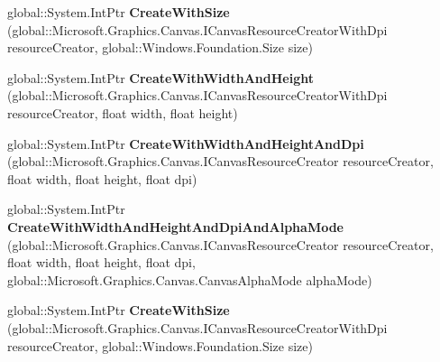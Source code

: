 \begin{DoxyCompactItemize}
\mbox{\label{interface_microsoft_1_1_graphics_1_1_canvas_1_1_u_i_1_1_xaml_1_1_i_canvas_image_source_factory_a4baedcf33415e7e6999fbfaef3bbfbcf}} 
global\+::\+System.\+Int\+Ptr {\bfseries Create\+With\+Size} (global\+::\+Microsoft.\+Graphics.\+Canvas.\+I\+Canvas\+Resource\+Creator\+With\+Dpi resource\+Creator, global\+::\+Windows.\+Foundation.\+Size size)
\item 
\mbox{\label{interface_microsoft_1_1_graphics_1_1_canvas_1_1_u_i_1_1_xaml_1_1_i_canvas_image_source_factory_a10963349bb9cd2efbf8a9fd0e452503b}} 
global\+::\+System.\+Int\+Ptr {\bfseries Create\+With\+Width\+And\+Height} (global\+::\+Microsoft.\+Graphics.\+Canvas.\+I\+Canvas\+Resource\+Creator\+With\+Dpi resource\+Creator, float width, float height)
\item 
\mbox{\label{interface_microsoft_1_1_graphics_1_1_canvas_1_1_u_i_1_1_xaml_1_1_i_canvas_image_source_factory_a6cfd3bc04a35df5bd6c867d8ded122c0}} 
global\+::\+System.\+Int\+Ptr {\bfseries Create\+With\+Width\+And\+Height\+And\+Dpi} (global\+::\+Microsoft.\+Graphics.\+Canvas.\+I\+Canvas\+Resource\+Creator resource\+Creator, float width, float height, float dpi)
\item 
\mbox{\label{interface_microsoft_1_1_graphics_1_1_canvas_1_1_u_i_1_1_xaml_1_1_i_canvas_image_source_factory_a7f81e40660e111a979eb5fc6d370cce8}} 
global\+::\+System.\+Int\+Ptr {\bfseries Create\+With\+Width\+And\+Height\+And\+Dpi\+And\+Alpha\+Mode} (global\+::\+Microsoft.\+Graphics.\+Canvas.\+I\+Canvas\+Resource\+Creator resource\+Creator, float width, float height, float dpi, global\+::\+Microsoft.\+Graphics.\+Canvas.\+Canvas\+Alpha\+Mode alpha\+Mode)
\item 
\mbox{\label{interface_microsoft_1_1_graphics_1_1_canvas_1_1_u_i_1_1_xaml_1_1_i_canvas_image_source_factory_a4baedcf33415e7e6999fbfaef3bbfbcf}} 
global\+::\+System.\+Int\+Ptr {\bfseries Create\+With\+Size} (global\+::\+Microsoft.\+Graphics.\+Canvas.\+I\+Canvas\+Resource\+Creator\+With\+Dpi resource\+Creator, global\+::\+Windows.\+Foundation.\+Size size)

\end{DoxyCompactItemize}
